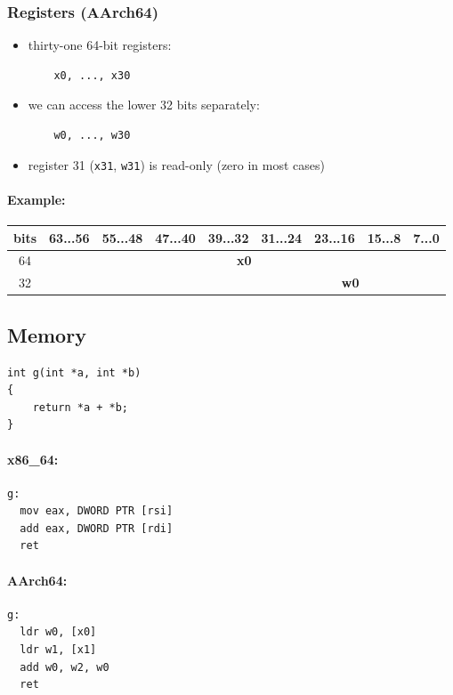 \documentclass[12pt]{article}
\begin{document}
\subsubsection{Registers (AArch64)}

\begin{itemize}
    \item thirty-one 64-bit registers:
    \begin{verbatim}
    x0, ..., x30
    \end{verbatim}
    
    \item we can access the lower 32 bits separately:
    \begin{verbatim}
    w0, ..., w30
    \end{verbatim}
    
    \item register 31 (\texttt{x31}, \texttt{w31}) is read-only (zero in most cases)
\end{itemize}

\paragraph{Example:}
\begin{tabular}{|c|c|c|c|c|c|c|c|c|}
\hline
\textbf{bits} & 63...56 & 55...48 & 47...40 & 39...32 & 31...24 & 23...16 & 15...8 & 7...0 \\
\hline
64 &  \multicolumn{8}{|c|}{\textbf{x0}} \\
\hline
32 &  &  &  &  & \multicolumn{4}{|c|}{\textbf{w0}} \\
\hline
\end{tabular}
\subsection{Memory}
\begin{verbatim}
int g(int *a, int *b)
{
    return *a + *b;
}
\end{verbatim}

\paragraph{x86\_64:}
\begin{verbatim}
g:
  mov eax, DWORD PTR [rsi]
  add eax, DWORD PTR [rdi]
  ret
\end{verbatim}

\paragraph{AArch64:}
\begin{verbatim}
g:
  ldr w0, [x0]
  ldr w1, [x1]
  add w0, w2, w0
  ret
\end{verbatim}
\end{document}
